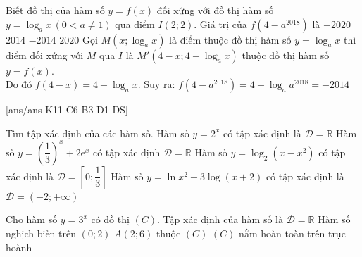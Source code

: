 \begin{ex}%
	Biết đồ thị của hàm số $y=f\left(x\right)$ đối xứng với đồ thị hàm số $y=\log_ax \, \left(0<a\ne 1\right)$ qua điểm $I\left(2;2\right)$. Giá trị của $f\left(4-a^{2018}\right)$ là
	\choice
	{$-2020$}
	{$2014$}
	{\True $-2014$}
	{$2020$}
	\loigiai
	{
		Gọi $M\left(x;\log_ax\right)$ là điểm thuộc đồ thị hàm số $y=\log_ax$ thì điểm đối xứng với $M$ qua $I$ là ${M}'\left(4-x;4-\log_ax\right)$ thuộc đồ thị hàm số $y=f(x)$.\\
		Do đó $f\left(4-x\right)=4-\log_ax$.
		Suy ra: $f\left(4-a^{2018}\right)=4-\log_aa^{2018}=-2014$
	}
\end{ex}

\cauds
{}[ans/ans-K11-C6-B3-D1-DS]

\begin{ex}%
	Tìm tập xác định của các hàm số.
	\choiceTF
	{\True Hàm số $y=2^x$ có tập xác định là $\mathscr{D} = \mathbb{R}$}
	{\True Hàm số $y = \left( \dfrac{1}{3} \right)^x + 2\mathrm{e}^x$ có tập xác định $\mathscr{D} = \mathbb{R}$}
	{Hàm số $y = \log_2 (x-x^2)$ có tập xác định là $\mathscr{D} = \left[ 0;\dfrac{1}{3} \right]$}
	{Hàm số $y = \ln x^2 + 3\log(x+2)$ có tập xác định là $\mathscr{D} = (-2;+\infty)$}
\end{ex}

\begin{ex}%
	Cho hàm số $y=3^x$ có đồ thị $(C)$.
	\choiceTF
	{\True Tập xác định của hàm số là $\mathscr{D} = \mathbb{R}$}
	{Hàm số nghịch biến trên $(0;2)$}
	{$A(2;6)$ thuộc $(C)$}
	{\True $(C)$ nằm hoàn toàn trên trục hoành}
\end{ex}

